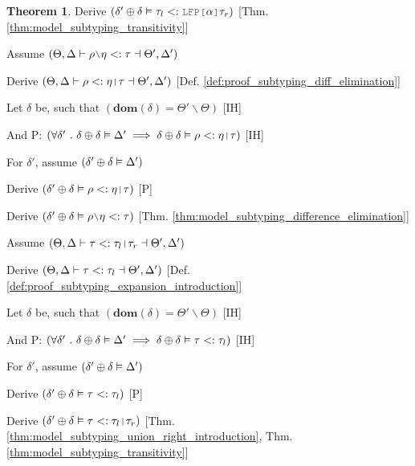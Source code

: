 \documentclass[acmsmall]{acmart}
\theoremstyle{definition}
\newtheorem{theorem}{Theorem}[section]
\begin{document}
\begin{theorem}
  \item \I\I \N Derive $(
    \delta' \oplus \delta \satisfies
    \tau_l \subtypes \J{LFP[} \alpha \J{]} \tau_r
  )$ [Thm. \ref{thm:model_subtyping_transitivity}]


  \item \N Assume $(
    \Theta, \Delta \entails 
    \rho \typdiff \eta \subtypes \tau \given \Theta', \Delta'
  )$
  \item \I \N Derive $(
    \Theta, \Delta \entails 
    \rho \subtypes \eta \J{|} \tau \given \Theta', \Delta'
  )$ [Def. \ref{def:proof_subtyping_diff_elimination}]

  \item \I \N Let $\delta$ be, such that $(
    \textbf{dom}(\delta) = \Theta' \backslash \Theta
  )$ [IH]
  \item \I \N And P: $(
    \forall \delta' \qua 
    \delta \oplus \delta \satisfies \Delta' 
    \implies 
    \delta \oplus \delta \satisfies \rho \subtypes \eta \J{|} \tau
  )$ [IH]
  \item \I \N For $\delta'$, assume $(\delta' \oplus \delta \vDash \Delta')$
  \item \I\I \N Derive $(\delta' \oplus \delta \satisfies \rho \subtypes \eta \J{|} \tau)$ [P]
  \item \I\I \N Derive $(\delta' \oplus \delta \satisfies \rho \typdiff \eta \subtypes \tau)$ [Thm. \ref{thm:model_subtyping_difference_elimination}]


  \item \N Assume $(
    \Theta, \Delta \entails \tau \subtypes \tau_{l}\J{|}\tau_{r} \given \Theta', \Delta' 
  )$
  \item \I \N Derive $(
    \Theta, \Delta \vdash \tau <: \tau_{l} \dashv \Theta', \Delta' 
  )$ [Def. \ref{def:proof_subtyping_expansion_introduction}]

  \item \I \N Let $\delta$ be, such that $(
    \textbf{dom}(\delta) = \Theta' \backslash \Theta
  )$ [IH]
  \item \I \N And P: $(
    \forall \delta' \ .\  
    \delta \oplus \delta \vDash \Delta' 
    \implies 
    \delta \oplus \delta \vDash \tau <: \tau_{l}
  )$ [IH]
  \item \I \N For $\delta'$, assume $(\delta' \oplus \delta \vDash \Delta')$
  \item \I\I \N Derive $(\delta' \oplus \delta \vDash \tau <: \tau_{l})$ [P]
  \item \I\I \N Derive $(
    \delta' \oplus \delta \satisfies \tau \subtypes \tau_l \J{|} \tau_r
  )$ [Thm. \ref{thm:model_subtyping_union_right_introduction}, Thm. \ref{thm:model_subtyping_transitivity}]


\end{theorem}
\end{document}
